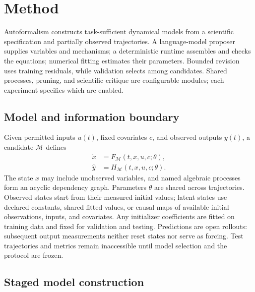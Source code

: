 \section{Method}
\label{sec:autoformalism-method}

Autoformalism constructs task-sufficient dynamical models from a scientific
specification and partially observed trajectories. A language-model proposer
supplies variables and mechanisms; a deterministic runtime assembles and checks
the equations; numerical fitting estimates their parameters. Bounded revision
uses training residuals, while validation selects among candidates. Shared
processes, pruning, and scientific critique are configurable modules; each
experiment specifies which are enabled.

\subsection{Model and information boundary}
\label{sec:af-model}

Given permitted inputs $u(t)$, fixed covariates $c$, and observed outputs $y(t)$,
a candidate $\mathcal M$ defines
\begin{equation}
 \begin{aligned}
 \dot{x}&=F_{\mathcal M}(t,x,u,c;\theta),\\
 \widehat y&=H_{\mathcal M}(t,x,u,c;\theta).
 \end{aligned}
 \label{eq:af-model}
\end{equation}
The state $x$ may include unobserved variables, and named algebraic processes
form an acyclic dependency graph. Parameters $\theta$ are shared across
trajectories. Observed states start from their measured initial values; latent
states use declared constants, shared fitted values, or causal maps of available
initial observations, inputs, and covariates. Any initializer coefficients are
fitted on training data and fixed for validation and testing. Predictions are
open rollouts: subsequent output measurements neither reset states nor serve as
forcing. Test trajectories and metrics remain inaccessible until model selection
and the protocol are frozen.

\subsection{Staged model construction}
\label{sec:af-construction}

